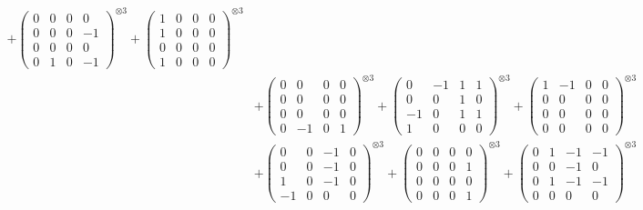 \documentclass{article}
\begin{document}
{\begin{align}
            + \begin{pmatrix} 0 & 0 & 0 & 0 \\ 0 & 0 & 0 & -1 \\ 0 & 0 & 0 & 0 \\ 0 & 1 & 0 & -1 \end{pmatrix}^{\otimes 3} 
            + \begin{pmatrix} 1 & 0 & 0 & 0 \\ 1 & 0 & 0 & 0 \\ 0 & 0 & 0 & 0 \\ 1 & 0 & 0 & 0 \end{pmatrix}^{\otimes 3} \\
        &+ \label{Rs16-Rc11-Solution-25-c10} \begin{pmatrix} 0 & 0 & 0 & 0 \\ 0 & 0 & 0 & 0 \\ 0 & 0 & 0 & 0 \\ 0 & -1 & 0 & 1 \end{pmatrix}^{\otimes 3} 
            + \begin{pmatrix} 0 & -1 & 1 & 1 \\ 0 & 0 & 1 & 0 \\ -1 & 0 & 1 & 1 \\ 1 & 0 & 0 & 0 \end{pmatrix}^{\otimes 3} 
            + \begin{pmatrix} 1 & -1 & 0 & 0 \\ 0 & 0 & 0 & 0 \\ 0 & 0 & 0 & 0 \\ 0 & 0 & 0 & 0 \end{pmatrix}^{\otimes 3} \\
        &+ \label{Rs16-Rc11-Solution-25-c13} \begin{pmatrix} 0 & 0 & -1 & 0 \\ 0 & 0 & -1 & 0 \\ 1 & 0 & -1 & 0 \\ -1 & 0 & 0 & 0 \end{pmatrix}^{\otimes 3} 
            + \begin{pmatrix} 0 & 0 & 0 & 0 \\ 0 & 0 & 0 & 1 \\ 0 & 0 & 0 & 0 \\ 0 & 0 & 0 & 1 \end{pmatrix}^{\otimes 3} 
            + \begin{pmatrix} 0 & 1 & -1 & -1 \\ 0 & 0 & -1 & 0 \\ 0 & 1 & -1 & -1 \\ 0 & 0 & 0 & 0 \end{pmatrix}^{\otimes 3} \\

\end{align}}
\end{document}
